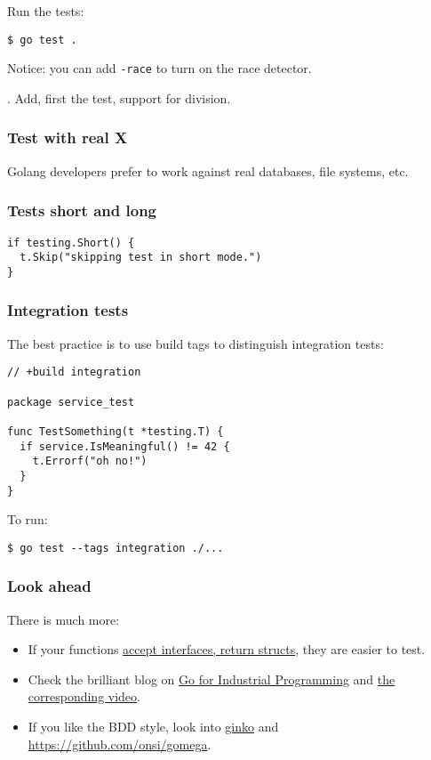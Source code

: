 \documentclass[11pt, letterpaper]{article}
\begin{document}
Run the tests:

\begin{verbatim}
$ go test .
\end{verbatim}

Notice: you can add \verb|-race| to turn on the race detector.

. Add, first the test, support for division.

\subsubsection{Test with real X}

Golang developers prefer to work against real databases, file systems, etc.

\subsubsection{Tests short and long}

\begin{verbatim}
if testing.Short() {
  t.Skip("skipping test in short mode.")
}
\end{verbatim}

\subsubsection{Integration tests}

The best practice is to use build tags to distinguish integration tests:

\begin{verbatim}
// +build integration

package service_test

func TestSomething(t *testing.T) {
  if service.IsMeaningful() != 42 {
    t.Errorf("oh no!")
  }
}
\end{verbatim}

To run:

\begin{verbatim}
$ go test --tags integration ./...
\end{verbatim}

\subsubsection{Look ahead}
There is much more:

\begin{itemize}
\item If your functions \href{https://blog.chewxy.com/2018/03/18/golang-interfaces/}{accept interfaces, return structs}, they are easier to test.
\item Check the brilliant blog on \href{https://peter.bourgon.org/go-for-industrial-programming/}{Go for Industrial Programming} and \href{https://www.youtube.com/watch?v=PTE4VJIdHPg}{the corresponding video}.
\item If you like the BDD style, look into \href{https://github.com/onsi/ginkgo}{ginko} and \href{gomega}{https://github.com/onsi/gomega}.
\end{itemize}
\end{document}
